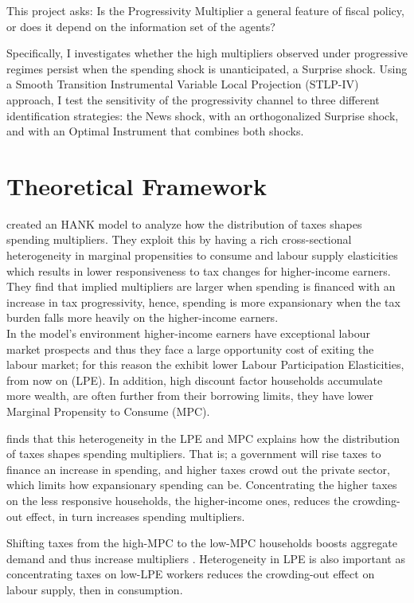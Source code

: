 \documentclass[12pt,letterpaper]{article}
\begin{document}
This project asks: Is the Progressivity Multiplier a general feature of fiscal policy, or does it depend on the information set of the agents?

    Specifically, I investigates whether the high multipliers observed under progressive regimes persist when the spending shock is unanticipated, a Surprise shock. Using a Smooth Transition Instrumental Variable Local Projection (STLP-IV) approach, I test the sensitivity of the progressivity channel to three different identification strategies: the \cite{RameyZubairy2018} News shock, with an orthogonalized \cite{BP} Surprise shock, and with an Optimal Instrument that combines both shocks.




\section{Theoretical Framework}
\cite{FN} created an HANK model to analyze how the distribution of taxes shapes spending multipliers. They exploit this by having a rich cross-sectional heterogeneity in marginal propensities to consume and labour supply elasticities which results in lower responsiveness to tax changes for higher-income earners.
\\ 
They find that implied multipliers are larger when spending is financed with an increase in tax progressivity, hence, spending is more expansionary when the tax burden falls more heavily on the higher-income earners.
\\
In the model's environment higher-income earners have exceptional labour market prospects and thus they face a large opportunity cost of exiting the labour market; for this reason the exhibit lower Labour Participation Elasticities, from now on (LPE).
In addition, high discount factor households accumulate more wealth, are often further from their borrowing limits, they have lower Marginal Propensity to Consume (MPC).

\cite{FN} finds that this heterogeneity in the LPE and MPC explains how the distribution of taxes shapes spending multipliers.
That is; a government will rise taxes to finance an increase in spending, and higher taxes crowd out the private sector, which limits how expansionary spending can be. 
Concentrating the higher taxes on the less responsive households, the higher-income ones, reduces the crowding-out effect, in turn increases spending multipliers.

Shifting taxes from the high-MPC to the low-MPC households boosts aggregate demand and thus increase multipliers \cite{FN}.
Heterogeneity in LPE is also important as concentrating taxes on low-LPE workers reduces the crowding-out effect on labour supply, then in consumption.
\end{document}
